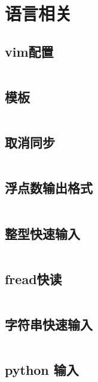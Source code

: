 \section{语言相关} 
\subsection{vim配置} 

\inputminted{text}{code/vim.txt}

\subsection{模板} 

\inputminted{cpp}{code/复杂模板.cc}

\subsection{取消同步} 

\inputminted{cpp}{code/取消同步.cc}

\subsection{浮点数输出格式} 

\inputminted{cpp}{code/浮点数输出.cc}

\subsection{整型快速输入} 

\inputminted{cpp}{code/整型快读.cc}

\subsection{fread快读} 

\inputminted{cpp}{code/fread快读.cpp}

\subsection{字符串快速输入} 

\inputminted{cpp}{code/字符串快读.cc}

\subsection{python 输入} 

\inputminted{py}{code/pythonInput.py}

